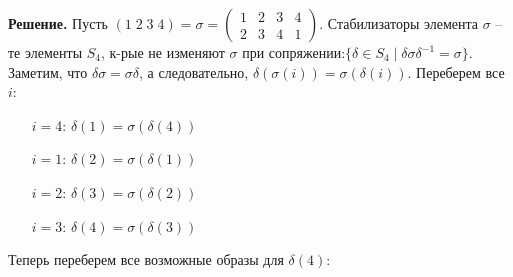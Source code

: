 \documentclass[a4paper, 12pt]{article}
\begin{document}
\begin{spacing}{1}
\noindent \textbf{Решение.} Пусть $(1\;2\;3\;4) = \sigma = \begin{pmatrix}
1 & 2 & 3 & 4 \\
2 & 3 & 4 & 1
\end{pmatrix}$. Стабилизаторы элемента $\sigma$ -- те элементы $S_4$, к-рые не изменяют $\sigma$ при сопряжении:$\{\delta \in S_4\;|\;\delta \sigma \delta^{-1} = \sigma\}$. Заметим, что $\delta \sigma = \sigma \delta$, а следовательно, $\delta(\sigma(i)) = \sigma(\delta(i))$. Переберем все $i$:
\begin{enumerate}
	\item[$i = 4$:] $\delta(1) = \sigma(\delta(4))$
	\item[$i = 1$:] $\delta(2) = \sigma(\delta(1))$
	\item[$i = 2$:] $\delta(3) = \sigma(\delta(2))$
	\item[$i = 3$:] $\delta(4) = \sigma(\delta(3))$
\end{enumerate}
Теперь переберем все возможные образы для $\delta(4)$:
\end{spacing}
\end{document}
